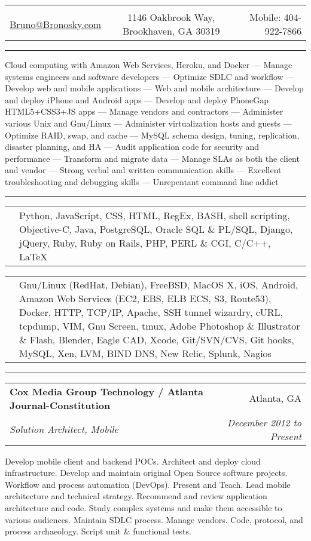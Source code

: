 \documentclass[10pt]{article}
\makeatletter
\newcommand{\heading}[4]{
    \begin{center}
    \begin{tabular*}{\textwidth}{@{\extracolsep{\fill}}lcr}
    &\huge{\textbf{\sc{#1}}}&\\
    \href{mailto:#2}{\small #2} & \small #3 & \small Mobile: #4\\
    \hline\hline
    \end{tabular*}
    \end{center}
}
\newcounter{blocktitlechildren}
\newcommand{\blocktitle}[1]{
    \blocktitlechild{4mm}
    \setcounter{blocktitlechildren}{0}
    {{\sc{#1}\vspace{1.5mm}\hrule}\vspace*{1.5mm}}
}
\newcommand{\blocktitlechild}[2][]{
    \ifthenelse{\equal{\value{blocktitlechildren}}{0}}{}{\vspace{#2}#1}
    \addtocounter{blocktitlechildren}{1}
}
\newcommand{\skillnew}[2]{
    \blocktitlechild{1mm}
    \begin{tabular}
        {p{2cm}p{17cm}}
        \noindent\raggedright{\skillfont{#1}} & #2
    \end{tabular}
}
\newcommand{\sectionheader}[4]{
    \blocktitlechild{2mm}
    \begin{tabular*}{\textwidth}{l@{\extracolsep{\fill}}r}
    \textbf{#1} & #2\\
    \emph{#3} & \emph{#4}
    \end{tabular*}
}
\newenvironment{longtext}[1]{\small {#1}}
\makeatother
\begin{document}
\heading{Bruno Bronosky}
{Bruno@Bronosky.com}
{1146 Oakbrook Way, Brookhaven, GA 30319}
{404-922-7866}

\blocktitle{Overview}
\blocktitlechild{2mm}
\begin{longtext}
    Cloud computing with Amazon Web Services, Heroku, and Docker ---
    Manage systems engineers and software developers ---
    Optimize SDLC and workflow ---
    Develop web and mobile applications ---
    Web and mobile architecture ---
    Develop and deploy iPhone and Android apps ---
    Develop and deploy PhoneGap HTML5+CSS3+JS apps ---
    Manage vendors and contractors ---
    Administer various Unix and Gnu/Linux ---
    Administer virtualization hosts and guests ---
    Optimize RAID, swap, and cache ---
    MySQL schema design, tuning, replication, disaster planning, and HA ---
    Audit application code for security and performance ---
    Transform and migrate data ---
    Manage SLAs as both the client and vendor ---
    Strong verbal and written communication skills ---
    Excellent troubleshooting and debugging skills ---
    Unrepentant command line addict
\end{longtext}

\blocktitle{Skills}
\skillnew{Languages \& Frameworks}{
    Python,
    JavaScript,
    CSS,
    HTML,
    RegEx,
    BASH,
    shell scripting,
    Objective-C,
    Java,
    PostgreSQL,
    Oracle SQL \& PL/SQL,
    Django,
    jQuery,
    Ruby,
    Ruby on Rails,
    PHP,
    PERL \& CGI,
    C/C++,
    \LaTeX
}

\skillnew{Systems \& Software}{
    Gnu/Linux (RedHat, Debian),
    FreeBSD,
    MacOS X,
    iOS,
    Android,
    Amazon Web Services (EC2, EBS, ELB ECS, S3, Route53),
    Docker,
    HTTP,
    TCP/IP,
    Apache,
    SSH tunnel wizardry,
    cURL,
    tcpdump,
    VIM,
    Gnu Screen,
    tmux,
    Adobe Photoshop \& Illustrator \& Flash,
    Blender,
    Eagle CAD,
    Xcode,
    Git/SVN/CVS,
    Git hooks,
    MySQL,
    Xen,
    LVM,
    BIND DNS,
    New Relic,
    Splunk,
    Nagios
}

\blocktitle{Challenges Accepted}
\sectionheader
{Cox Media Group Technology / Atlanta Journal-Constitution}
{Atlanta, GA}
{Solution Architect, Mobile}
{December 2012 to Present}
\begin{longtext}
Develop mobile client and backend POCs.
Architect and deploy cloud infrastructure.
Develop and maintain original Open Source software projects.
Workflow and process automation (DevOps).
Present and Teach.
Lead mobile architecture and technical strategy.
Recommend and review application architecture and code.
Study complex systems and make them accessible to various audiences.
Maintain SDLC process.
Manage vendors.
Code, protocol, and process archaeology.
Script unit \& functional tests.
\end{longtext}
\end{document}

